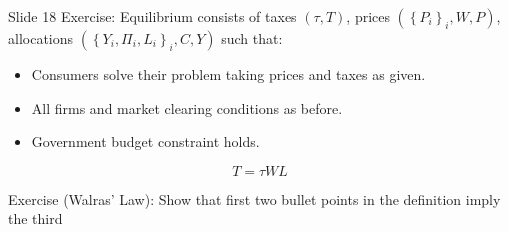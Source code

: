 Slide 18 Exercise: Equilibrium consists of taxes $(\tau, T)$, prices $\left(\left\{P_i\right\}_i, W, P\right)$, allocations $\left(\left\{Y_i, \Pi_i, L_i\right\}_i, C, Y\right)$ such that:

\begin{itemize}
    \item Consumers solve their problem taking prices and taxes as given.
    \item All firms and market clearing conditions as before.
    \item Government budget constraint holds.
\end{itemize}
  

$$
T=\tau W L
$$

Exercise (Walras' Law): Show that first two bullet points in the definition imply the third